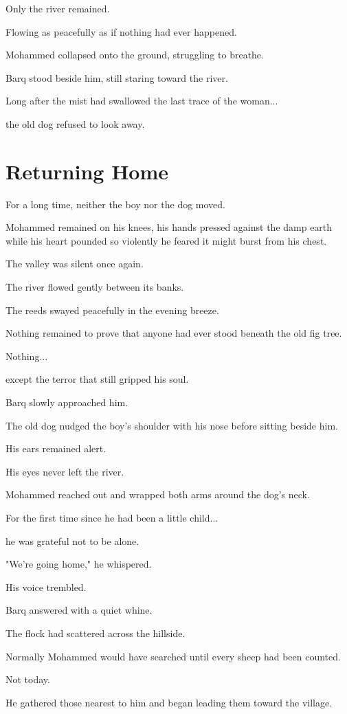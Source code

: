 \documentclass[12pt,openany]{book}
\begin{document}
Only the river remained.

Flowing as peacefully as if nothing had ever happened.

Mohammed collapsed onto the ground, struggling to breathe.

Barq stood beside him, still staring toward the river.

Long after the mist had swallowed the last trace of the woman...

the old dog refused to look away.
\section*{Returning Home}

For a long time, neither the boy nor the dog moved.

Mohammed remained on his knees, his hands pressed against the damp earth while his heart pounded so violently he feared it might burst from his chest.

The valley was silent once again.

The river flowed gently between its banks.

The reeds swayed peacefully in the evening breeze.

Nothing remained to prove that anyone had ever stood beneath the old fig tree.

Nothing...

except the terror that still gripped his soul.

Barq slowly approached him.

The old dog nudged the boy's shoulder with his nose before sitting beside him.

His ears remained alert.

His eyes never left the river.

Mohammed reached out and wrapped both arms around the dog's neck.

For the first time since he had been a little child...

he was grateful not to be alone.

"We're going home," he whispered.

His voice trembled.

Barq answered with a quiet whine.

The flock had scattered across the hillside.

Normally Mohammed would have searched until every sheep had been counted.

Not today.

He gathered those nearest to him and began leading them toward the village.
\end{document}
